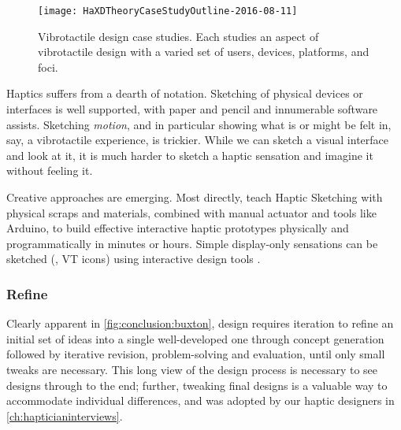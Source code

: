 \begin{figure}[htbp]
\begin{center}
\texttt{[image: HaXDTheoryCaseStudyOutline-2016-08-11]}
\caption{Vibrotactile design case studies. Each studies an aspect of vibrotactile design with a varied set of users, devices, platforms, and foci.}
\label{fig:intro:casestudyoverview}
\end{center}
\end{figure}



%


	Haptics suffers from a dearth of notation.
	Sketching of physical devices or interfaces is well supported, with paper and pencil and innumerable software assists.
	Sketching \textit{motion}, and in particular showing what is or might be felt in, say, a vibrotactile experience, is  trickier.
	While we can sketch a visual interface and look at it, it is much harder to sketch a haptic sensation and imagine it without feeling it.

Creative approaches are emerging.
Most directly, \citet{Moussette2011} teach Haptic Sketching with physical scraps and materials, combined with manual actuator and tools like Arduino, to build effective interactive haptic prototypes physically and programmatically  in minutes or hours.
Simple display-only sensations can be sketched (\eg, VT icons)  using interactive design tools \cite{schneider2014improvising,Hong2013}.



%
%
\subsubsection{Refine}
Clearly apparent in \autoref{fig:conclusion:buxton}, design requires iteration to refine an initial set of ideas into a single well-developed one through concept generation followed by iterative revision, problem-solving and  evaluation, until only small tweaks are necessary.
This long view of the design process is necessary to see designs through to the end;
further, tweaking final designs is a valuable way to accommodate individual differences, and was adopted by our haptic designers in \autoref{ch:hapticianinterviews}.


